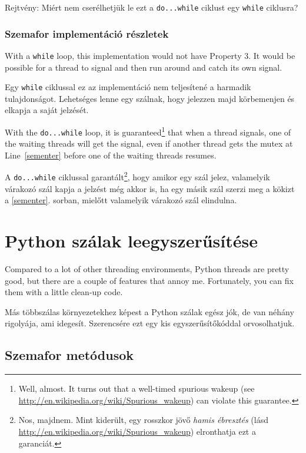 \documentclass{book}
\newcommand{\clearemptydoublepage}{\newpage\cleardoublepage}
\begin{document}
Rejtvény: Miért nem cserélhetjük le ezt a {\tt do...while} ciklust
egy {\tt while} ciklusra?

\clearemptydoublepage
\subsection{Szemafor implementáció részletek}

With a {\tt while} loop, this implementation would not have
Property 3.  It would be possible for a thread to signal
and then run around and catch its own signal.

Egy {\tt while} ciklussal ez az implementáció nem teljesítené
a harmadik tulajdonságot.  Lehetséges lenne egy szálnak, hogy jelezzen
majd körbemenjen és elkapja a saját jelzését.

With the {\tt do...while} loop, it is guaranteed\footnote{Well,
  almost.  It turns out that a well-timed spurious wakeup (see
  \url{http://en.wikipedia.org/wiki/Spurious_wakeup}) can violate this
  guarantee.} that when a thread signals, one of the waiting threads
will get the signal, even if another thread gets the mutex at
Line~\ref{sementer} before one of the waiting threads resumes.

A {\tt do...while} ciklussal garantált\footnote{Nos,
majdnem. Mint kiderült, egy rosszkor jövő {\em hamis ébresztés} (lásd
\url{http://en.wikipedia.org/wiki/Spurious_wakeup}) elronthatja ezt a garanciát.},
hogy amikor egy szál jelez, valamelyik várakozó szál kapja
a jelzést még akkor is, ha egy másik szál szerzi meg a kökizt a
\ref{sementer}. sorban, mielőtt valamelyik várakozó szál elindulna.




\appendix

\chapter{Python szálak leegyszerűsítése}
\label{cleanup}

Compared to a lot of other threading environments, Python threads are
pretty good, but there are a couple of features that annoy me.
Fortunately, you can fix them with a little clean-up code.

Más többszálas környezetekhez képest a Python szálak egész jók,
de van néhány rigolyája, ami idegesít. Szerencsére ezt egy kis
egyszerűsítőkóddal orvosolhatjuk.

\section{Szemafor metódusok}
\end{document}
